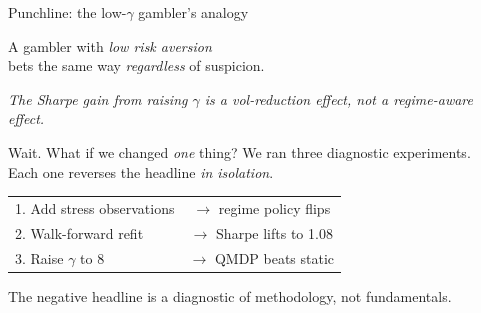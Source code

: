 \documentclass[11pt,aspectratio=169]{beamer}
\begin{document}
\begin{frame}{Punchline: the low-$\gamma$ gambler's analogy}
\bigskip
\begin{center}
\Large
A gambler with \emph{low risk aversion}\\
bets the same way \emph{regardless} of suspicion.

\bigskip\bigskip
{}

\bigskip\small
\emph{The Sharpe gain from raising $\gamma$ is a vol-reduction effect, not a regime-aware effect.}
\end{center}
\end{frame}


\begin{frame}{Wait. What if we changed \emph{one} thing?}
\bigskip
\centering
\large
We ran three diagnostic experiments.\\
Each one reverses the headline \emph{in isolation}.

\bigskip
\begin{tabular}{l c}
1. Add stress observations & $\to$ regime policy flips \\
2. Walk-forward refit & $\to$ Sharpe lifts to 1.08 \\
3. Raise $\gamma$ to 8 & $\to$ QMDP beats static \\
\end{tabular}

\bigskip\bigskip
\small \alert{The negative headline is a diagnostic of methodology, not fundamentals.}
\end{frame}
\end{document}
